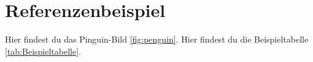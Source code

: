 \section{Referenzenbeispiel}
Hier findest du das Pinguin-Bild \ref{fig:penguin}.
Hier findest du die Beispieltabelle \ref{tab:Beispieltabelle}.